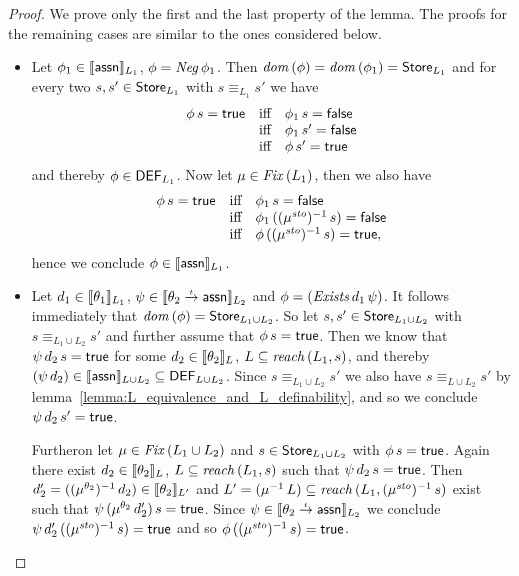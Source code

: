 \documentclass[12pt,a4paper]{report}
\newcommand{\ssto}{\nstyle{sto}}
\newcommand{\DEF}{\sstyle{DEF}}
\newcommand{\Fix}[1]{\nstyle{Fix}\,(#1)}
\newcommand{\Neg}{\nstyle{Neg}}
\newcommand{\Exists}{\nstyle{Exists}}
\begin{document}
\begin{proof}
  We prove only the first and the last property of the lemma. The proofs for the remaining cases are
  similar to the ones considered below.
  \begin{itemize}
    \item Let $\phi_1 \in \llbracket\mathsf{assn}\rrbracket_{L_1}$, $\phi = \Neg\,\phi_1$. Then
          $\mathit{dom}\,(\phi) = \mathit{dom}\,(\phi_1) = \mathsf{Store}_{L_1}$ and for every two $s,s'\in\mathsf{Store}_{L_1}$
          with $s \equiv_{L_1} s'$ we have
          \[\begin{array}{rcl}
            \phi\,s = \mathsf{true}
            &\text{iff}&
            \phi_1\,s = \mathsf{false} \\
            &\text{iff}&
            \phi_1\,s' = \mathsf{false} \\
            &\text{iff}&
            \phi\,s' = \mathsf{true}
          \end{array}\]
          and thereby $\phi\in\DEF_{L_1}$. Now let $\mu \in \Fix{L_1}$, then we also have
          \[\begin{array}{rcl}
            \phi\,s = \true
            &\text{iff}&
            \phi_1\,s = \false \\
            &\text{iff}&
            \phi_1\,((\mu^\ssto)^{-1}\,s) = \false \\
            &\text{iff}&
            \phi\,((\mu^\ssto)^{-1}\,s) = \true,
          \end{array}\]
          hence we conclude $\phi \in \llbracket\mathsf{assn}\rrbracket_{L_1}$.

    \item Let $d_1 \in \llbracket\theta_1\rrbracket_{L_1}$,
          $\psi \in \llbracket\theta_2\stackrel{_t}{\to}\mathsf{assn}\rrbracket_{L_2}$ and
          $\phi = (\Exists\,d_1\,\psi)$. It follows immediately that
          $\mathit{dom}\,(\phi) = \mathsf{Store}_{L_1 \cup L_2}$. So let $s,s' \in \mathsf{Store}_{L_1 \cup L_2}$ with
          $s \equiv_{L_1 \cup L_2} s'$ and further assume that $\phi\,s = \mathsf{true}$. Then we know that
          $\psi\,d_2\,s = \mathsf{true}$ for some $d_2 \in \llbracket\theta_2\rrbracket_L$,
          $L \subseteq \mathit{reach}\,(L_1,s)$, and thereby
          $(\psi\,d_2) \in \semantic{\tassn}_{L \cup L_2} \subseteq \DEF_{L \cup L_2}$.
          Since $s \equiv_{L_1\cup L_2} s'$ we also have $s \equiv_{L \cup L_2} s'$ by
          lemma~\ref{lemma:L_equivalence_and_L_definability}, and so we conclude
          $\psi\,d_2\,s' = \mathsf{true}$.

          Furtheron let $\mu \in \Fix{L_1 \cup L_2}$ and $s \in \mathsf{Store}_{L_1 \cup L_2}$ with $\phi\,s = \mathsf{true}$.
          Again there exist $d_2 \in \llbracket\theta_2\rrbracket_L$, $L \subseteq \mathit{reach}\,(L_1,s)$ such
          that $\psi\,d_2\,s=\mathsf{true}$. Then
          $d_2' = ((\mu^{\theta_2})^{-1}\,d_2)\in\llbracket\theta_2\rrbracket_{L'}$ and
          $L' = (\mu^{-1}\,L) \subseteq \reach{L_1}{(\mu^\ssto)^{-1}\,s}$ exist such that
          $\psi\,(\mu^{\theta_2}\,d_2')\,s=\mathsf{true}$.
          Since $\psi \in \llbracket\theta_2\stackrel{_t}{\to}\mathsf{assn}\rrbracket_{L_2}$ we conclude
          $\psi\,d_2'\,((\mu^\ssto)^{-1}\,s) = \true$ and so $\phi\,((\mu^\ssto)^{-1}\,s) = \true$.
  \end{itemize}
\end{proof}
\end{document}
